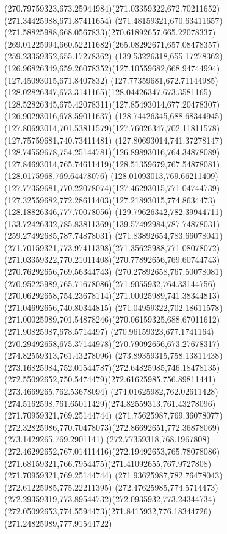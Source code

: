 {{{\curveto(270.79759323,673.25944984)(271.03359322,672.70211652)(271.34425988,671.87411654)
\curveto(271.48159321,670.63411657)(271.58825988,668.0567833)(270.61892657,665.22078337)
\curveto(269.01225994,660.52211682)(265.08292671,657.08478357)(259.23359352,655.17278362)
\lineto(139.53226318,655.17278362)
\curveto(126.96826349,659.26078352)(127.10559682,668.94744994)(127.45093015,671.8407832)
\curveto(127.77359681,672.71144985)(128.02826347,673.3141165)(128.04426347,673.3581165)
\curveto(128.52826345,675.42078311)(127.85493014,677.20478307)(126.90293016,678.59011637)
\curveto(128.74426345,688.68344945)(127.80693014,701.53811579)(127.76026347,702.11811578)
\lineto(127.75759681,740.73411481)
\curveto(127.80693014,741.37278147)(128.74559678,754.25144781)(126.89893016,764.34878089)
\curveto(127.84693014,765.74611419)(128.51359679,767.54878081)(128.0175968,769.64478076)
\curveto(128.01093013,769.66211409)(127.77359681,770.22078074)(127.46293015,771.04744739)
\curveto(127.32559682,772.28611403)(127.21893015,774.8634473)(128.18826346,777.70078056)
\curveto(129.79626342,782.39944711)(133.72426332,785.83811369)(139.57492984,787.74878031)
\lineto(259.27492685,787.74878031)
\curveto(271.83892654,783.66078041)(271.70159321,773.97411398)(271.35625988,771.08078072)
\curveto(271.03359322,770.21011408)(270.77892656,769.60744743)(270.76292656,769.56344743)
\curveto(270.27892658,767.50078081)(270.95225989,765.71678086)(271.9055932,764.33144756)
\curveto(270.06292658,754.23678114)(271.00025989,741.38344813)(271.04692656,740.80344815)
\lineto(271.04959322,702.18611578)
\curveto(271.00025989,701.54878246)(270.06159325,688.67011612)(271.90825987,678.5714497)
\curveto(270.96159323,677.1741164)(270.29492658,675.37144978)(270.79092656,673.27678317)
\moveto(274.82559313,761.43278096)
\curveto(273.89359315,758.13811438)(273.16825984,752.01544787)(272.64825985,746.18478135)
\curveto(272.55092652,750.5474479)(272.61625985,756.89811441)(273.4669265,762.53678094)
\curveto(274.01625982,762.02611428)(274.5162598,761.65011429)(274.82559313,761.43278096)
\moveto(271.70959321,769.25144744)
\curveto(271.75625987,769.36078077)(272.32825986,770.70478073)(272.86692651,772.36878069)
\lineto(273.1429265,769.2901141)
\curveto(272.77359318,768.1967808)(272.46292652,767.01411416)(272.19492653,765.78078086)
\curveto(271.68159321,766.7954475)(271.41092655,767.9727808)(271.70959321,769.25144744)
\moveto(271.93625987,782.76478043)
\lineto(272.61225985,775.22211395)
\curveto(272.47625985,774.5714473)(272.29359319,773.89544732)(272.0935932,773.24344734)
\curveto(272.05092653,774.5594473)(271.8415932,776.18344726)(271.24825989,777.91544722)
}}}
